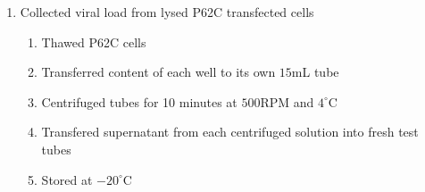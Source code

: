 \begin{enumerate}
	\item Collected viral load from lysed P62C transfected cells
		\begin{enumerate}
			\item Thawed P62C cells
			\item Transferred content of each well to its own $15$mL tube
			\item Centrifuged tubes for 10 minutes at $500$RPM and $4^{\circ}$C
			\item Transfered supernatant from each centrifuged solution into fresh test tubes
			\item Stored at $-20^{\circ}$C
		\end{enumerate}
\end{enumerate}